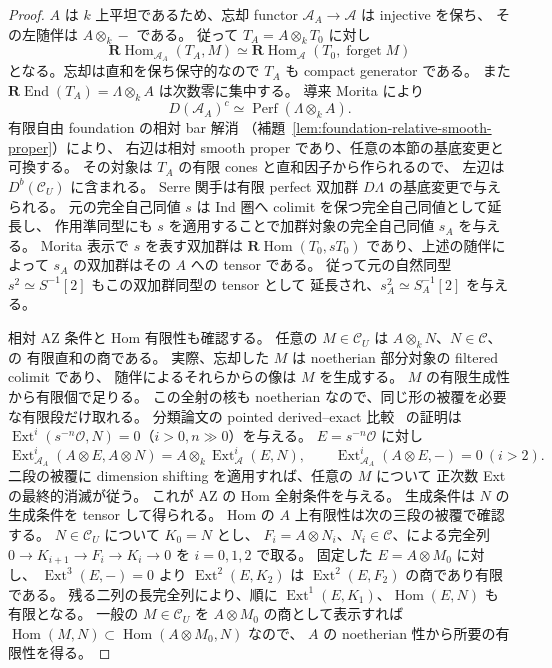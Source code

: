 \begin{proof}
$A$ は $k$ 上平坦であるため、忘却 functor
$\mathcal A_A\to\mathcal A$ は injective を保ち、
その左随伴は $A\otimes_k-$ である。
従って $T_A=A\otimes_kT_0$ に対し
\[
 \mathbf R\operatorname{Hom}_{\mathcal A_A}(T_A,M)
 \simeq\mathbf R\operatorname{Hom}_{\mathcal A}(T_0,\operatorname{forget}M)
\]
となる。忘却は直和を保ち保守的なので $T_A$ も compact generator である。
また $\mathbf R\operatorname{End}(T_A)=\Lambda\otimes_kA$ は次数零に集中する。
導来 Morita \cite[\S4.3, \S8.2]{Keller1994} により
\[
 D(\mathcal A_A)^c\simeq\operatorname{Perf}(\Lambda\otimes_kA).
\]
有限自由 foundation の相対 bar 解消
（補題~\ref{lem:foundation-relative-smooth-proper}）により、
右辺は相対 smooth proper であり、任意の本節の基底変更と可換する。
その対象は $T_A$ の有限 cones と直和因子から作られるので、
左辺は $D^b(\mathcal C_U)$ に含まれる。
Serre 関手は有限 perfect 双加群 $D\Lambda$ の基底変更で与えられる。
元の完全自己同値 $s$ は Ind 圏へ colimit を保つ完全自己同値として延長し、
作用準同型にも $s$ を適用することで加群対象の完全自己同値 $s_A$ を与える。
Morita 表示で $s$ を表す双加群は
$\mathbf R\operatorname{Hom}(T_0,sT_0)$ であり、上述の随伴によって
$s_A$ の双加群はその $A$ への tensor である。
従って元の自然同型 $s^2\simeq S^{-1}[2]$ もこの双加群同型の tensor として
延長され、$s_A^2\simeq S_A^{-1}[2]$ を与える。

相対 AZ 条件と Hom 有限性も確認する。
任意の $M\in\mathcal C_U$ は $A\otimes_kN$、$N\in\mathcal C$、の
有限直和の商である。
実際、忘却した $M$ は noetherian 部分対象の filtered colimit であり、
随伴によるそれらからの像は $M$ を生成する。
$M$ の有限生成性から有限個で足りる。
この全射の核も noetherian なので、同じ形の被覆を必要な有限段だけ取れる。
分類論文の pointed derived--exact 比較~\cite[pointed derived--exact 比較]{QuadricIntrinsic2026} の証明は
$\operatorname{Ext}^{i}(s^{-n}\mathcal O,N)=0$（$i>0,n\gg0$）を与える。
$E=s^{-n}\mathcal O$ に対し
\[
 \operatorname{Ext}^{i}_{\mathcal A_A}(A\otimes E,A\otimes N)
       =A\otimes_k\operatorname{Ext}^{i}_{\mathcal A}(E,N),
 \qquad\operatorname{Ext}^{i}_{\mathcal A_A}(A\otimes E,-)=0\ (i>2).
\]
二段の被覆に dimension shifting を適用すれば、任意の $M$ について
正次数 Ext の最終的消滅が従う。
これが AZ の Hom 全射条件を与える。
生成条件は $N$ の生成条件を tensor して得られる。
Hom の $A$ 上有限性は次の三段の被覆で確認する。
$N\in\mathcal C_U$ について $K_0=N$ とし、
$F_i=A\otimes N_i$、$N_i\in\mathcal C$、による完全列
$0\to K_{i+1}\to F_i\to K_i\to0$ を $i=0,1,2$ で取る。
固定した $E=A\otimes M_0$ に対し、
$\operatorname{Ext}^3(E,-)=0$ より
$\operatorname{Ext}^2(E,K_2)$ は $\operatorname{Ext}^2(E,F_2)$ の商であり有限である。
残る二列の長完全列により、順に
$\operatorname{Ext}^1(E,K_1)$、$\operatorname{Hom}(E,N)$ も有限となる。
一般の $M\in\mathcal C_U$ を $A\otimes M_0$ の商として表示すれば
$\operatorname{Hom}(M,N)\subset\operatorname{Hom}(A\otimes M_0,N)$ なので、
$A$ の noetherian 性から所要の有限性を得る。


\end{proof}
